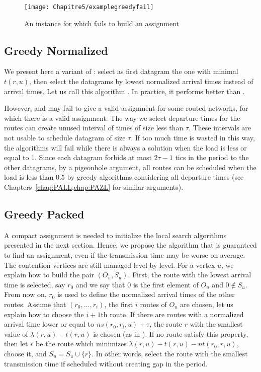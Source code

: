    \begin{figure} 
	\centering
	\texttt{[image: Chapitre5/examplegreedyfail]}
\caption{An instance for which \greedydeadline fails to build an assignment}
\label{fig:examplegreedyfail}   
\end{figure}
\subsection{Greedy Normalized}

We present here a variant of \greedydeadline: select as first datagram the one with minimal $t(r,u)$, then select the datagrams by lowest normalized arrival times instead of arrival times. Let us call this algorithm
\greedynormalized. In practice, it performs better than \greedydeadline.

However, \greedydeadline and \greedynormalized may fail to give a valid assignment for some routed networks, for which there is a valid assignment. The way we select departure times for the routes can create unused interval of times of size less than $\tau$. These intervals are not usable to schedule datagram of size $\tau$. If too much time is wasted in this way, the algorithms will fail while there is always a solution when the load is less or equal to $1$. Since each datagram forbids at most $2\tau -1$ tics in the period to the other datagrams, by a pigeonhole argument, all routes can be scheduled when the load is less than $0.5$ by greedy algorithms considering all departure times (see Chapters~\ref{chap:PALL,chap:PAZL} for similar arguments).



\subsection{Greedy Packed}


A compact assignment is needed to initialize the local search algorithms presented in the next section. Hence, we propose the \greedypacked algorithm that is guaranteed to find an assignment, even if the transmission time may be worse on average.
The contention vertices are still managed level by level. For a vertex $u$, we explain how to build the pair $(O_u,S_u)$. First, the route with the lowest arrival time is selected, say $r_0$ and we say that $0$ is the first element of $O_u$ and $0 \notin S_u$. From now on, $r_0$ is used to define the normalized arrival times of the other routes. Assume that $(r_0,\dots,r_i)$, the first $i$ routes of $O_u$ are chosen, let us explain how to choose the $i+1$th route. If there are routes with a normalized arrival time lower or equal to $ns(r_0,r_i,u)+\tau$, the route $r$ with the smallest value of $\lambda(r,u) - t(r,u)$ is chosen (as in \greedynormalized). If no route satisfy this property, then let $r$ be the route which minimizes $\lambda(r,u) - t(r,u) - nt(r_0,r,u)$, choose it, and $S_u = S_u \cup \{r\}$. In other words, select the route with the smallest transmission time if scheduled without creating gap in the period.


